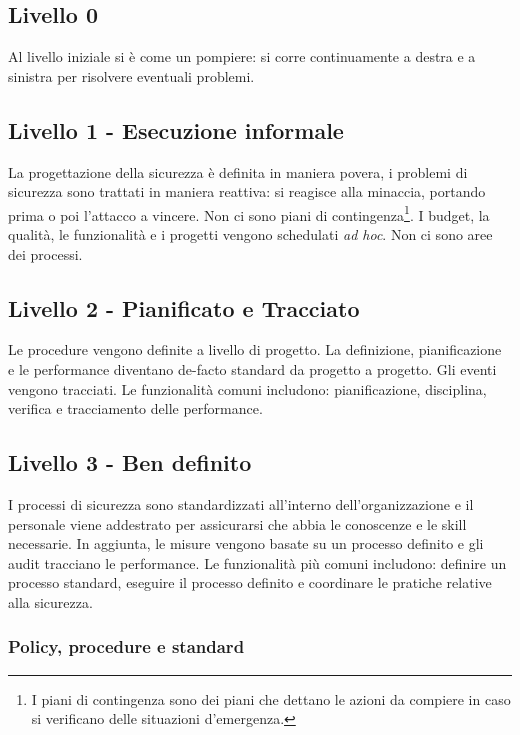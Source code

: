 \subsection{Livello 0}

Al livello iniziale si è come un pompiere: si corre continuamente a destra e a
sinistra per risolvere eventuali problemi.

\subsection{Livello 1 - Esecuzione informale}

La progettazione della sicurezza è definita in maniera povera, i problemi di
sicurezza sono trattati in maniera reattiva: si reagisce
alla minaccia, portando prima o poi l'attacco a vincere. Non ci sono piani di
contingenza\footnote{I piani di contingenza sono dei piani che dettano le
azioni da compiere in caso si verificano delle situazioni d'emergenza.}. I
budget, la qualità, le funzionalità e i progetti vengono schedulati \textit{ad
hoc}. Non ci sono aree dei processi.

\subsection{Livello 2 - Pianificato e Tracciato}

Le procedure vengono definite a livello di progetto. La definizione,
pianificazione e le performance diventano de-facto standard da progetto a
progetto. Gli eventi vengono tracciati. Le funzionalità comuni includono:
pianificazione, disciplina, verifica e tracciamento delle performance.

\subsection{Livello 3 - Ben definito}

I processi di sicurezza sono standardizzati all'interno dell'organizzazione e
il personale viene addestrato per assicurarsi che abbia le conoscenze e le
skill necessarie. In aggiunta, le misure vengono basate su un processo
definito e gli audit tracciano le performance. Le funzionalità più comuni
includono: definire un processo standard, eseguire il processo definito e
coordinare le pratiche relative alla sicurezza.

\subsubsection{Policy, procedure e standard}

